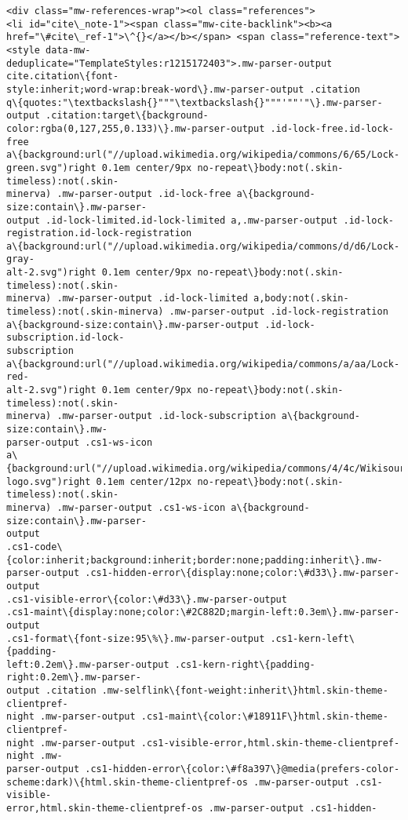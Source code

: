 \documentclass[11pt]{article}
\begin{document}
\begin{Verbatim}[commandchars=\\\{\}]
<div class="mw-references-wrap"><ol class="references">
<li id="cite\_note-1"><span class="mw-cite-backlink"><b><a
href="\#cite\_ref-1">\^{}</a></b></span> <span class="reference-text"><style data-mw-
deduplicate="TemplateStyles:r1215172403">.mw-parser-output cite.citation\{font-
style:inherit;word-wrap:break-word\}.mw-parser-output .citation
q\{quotes:"\textbackslash{}"""\textbackslash{}"""'""'"\}.mw-parser-output .citation:target\{background-
color:rgba(0,127,255,0.133)\}.mw-parser-output .id-lock-free.id-lock-free
a\{background:url("//upload.wikimedia.org/wikipedia/commons/6/65/Lock-
green.svg")right 0.1em center/9px no-repeat\}body:not(.skin-timeless):not(.skin-
minerva) .mw-parser-output .id-lock-free a\{background-size:contain\}.mw-parser-
output .id-lock-limited.id-lock-limited a,.mw-parser-output .id-lock-
registration.id-lock-registration
a\{background:url("//upload.wikimedia.org/wikipedia/commons/d/d6/Lock-gray-
alt-2.svg")right 0.1em center/9px no-repeat\}body:not(.skin-timeless):not(.skin-
minerva) .mw-parser-output .id-lock-limited a,body:not(.skin-
timeless):not(.skin-minerva) .mw-parser-output .id-lock-registration
a\{background-size:contain\}.mw-parser-output .id-lock-subscription.id-lock-
subscription
a\{background:url("//upload.wikimedia.org/wikipedia/commons/a/aa/Lock-red-
alt-2.svg")right 0.1em center/9px no-repeat\}body:not(.skin-timeless):not(.skin-
minerva) .mw-parser-output .id-lock-subscription a\{background-size:contain\}.mw-
parser-output .cs1-ws-icon
a\{background:url("//upload.wikimedia.org/wikipedia/commons/4/4c/Wikisource-
logo.svg")right 0.1em center/12px no-repeat\}body:not(.skin-timeless):not(.skin-
minerva) .mw-parser-output .cs1-ws-icon a\{background-size:contain\}.mw-parser-
output
.cs1-code\{color:inherit;background:inherit;border:none;padding:inherit\}.mw-
parser-output .cs1-hidden-error\{display:none;color:\#d33\}.mw-parser-output
.cs1-visible-error\{color:\#d33\}.mw-parser-output
.cs1-maint\{display:none;color:\#2C882D;margin-left:0.3em\}.mw-parser-output
.cs1-format\{font-size:95\%\}.mw-parser-output .cs1-kern-left\{padding-
left:0.2em\}.mw-parser-output .cs1-kern-right\{padding-right:0.2em\}.mw-parser-
output .citation .mw-selflink\{font-weight:inherit\}html.skin-theme-clientpref-
night .mw-parser-output .cs1-maint\{color:\#18911F\}html.skin-theme-clientpref-
night .mw-parser-output .cs1-visible-error,html.skin-theme-clientpref-night .mw-
parser-output .cs1-hidden-error\{color:\#f8a397\}@media(prefers-color-
scheme:dark)\{html.skin-theme-clientpref-os .mw-parser-output .cs1-visible-
error,html.skin-theme-clientpref-os .mw-parser-output .cs1-hidden-

\end{Verbatim}
\end{document}
